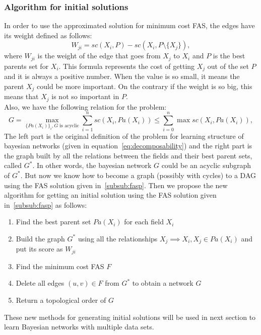 \subsubsection{Algorithm for initial solutions}
\label{subsub:fasalgorithm}
	In order to use the approximated solution for minimum cost FAS, the edges have its weight defined as follows:
		\begin{equation}
			\label{eq:weight}
			W_{ji} = {sc}( X_i , P ) - {sc}( X_i , P \setminus \{ X_j \} ) ,
		\end{equation}
	where $W_{ji}$ is the weight of the edge that goes from $X_j$ to $X_i$ and $P$ is the best parents set for $X_i$. This formula represents the cost of getting $X_j$ out of the set $P$ and it is always a positive number. When the value is so small, it means the parent $X_j$ could be more important. On the contrary if the weight is so big, this means that $X_j$ is not so important in $P$.\\
	Also, we have the following relation for the problem:
		\begin{equation}
			\label{eq:reduction}
			G = \max_{\{ {Pa}(X_i)\}_i, G \text{ is acyclic}} \sum_{i=1}^n {sc}( X_i , {Pa}( X_i ) ) \leq \sum_{i=0}^{n} \max {sc}( X_i , {Pa}( X_i ) ) ,
		\end{equation}
	The left part is the original definition of the problem for learning structure of bayesian networks (given in equation~\ref{eq:decomposability}) and the right part is the graph built by all the relations between the fields and their best parent sets, called $G^*$. In other words, the bayesian network $G$ could be an acyclic subgraph of $G^*$. But now we know how to become a graph (possibly with cycles) to a DAG using the FAS solution given in~\ref{subsub:fasp}.
	Then we propose the new algorithm for getting an initial solution using the FAS solution given in~\ref{subsub:fasp} as follows:
	\begin{enumerate}
		\item Find the best parent set ${Pa}( X_i )$ for each field $X_i$
		\item Build the graph $G^*$ using all the relationships $X_j \implies X_i, X_j \in {Pa}( X_i )$ and put its score as $W_{ji}$
		\item Find the minimum cost FAS $F$
		\item Delete all edges $(u,v) \in F$ from $G^*$ to obtain a network $G$
		\item Return a topological order of $G$
	\end{enumerate}

These new methods for generating initial solutions will be used in next section to learn Bayesian networks with multiple data sets.